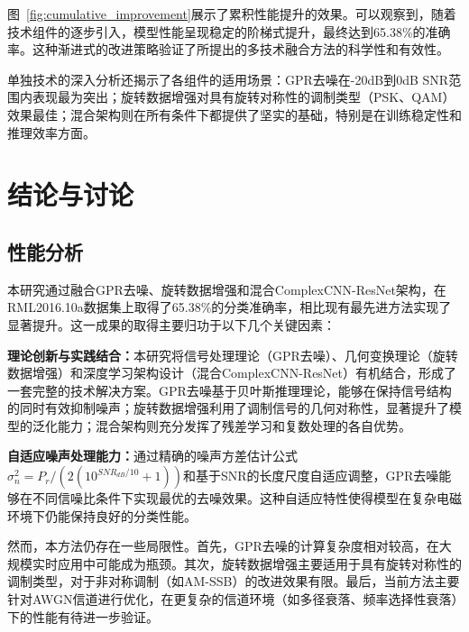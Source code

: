 \documentclass[conference]{IEEEtran}
\begin{document}
图~\ref{fig:cumulative_improvement}展示了累积性能提升的效果。可以观察到，随着技术组件的逐步引入，模型性能呈现稳定的阶梯式提升，最终达到65.38\%的准确率。这种渐进式的改进策略验证了所提出的多技术融合方法的科学性和有效性。

单独技术的深入分析还揭示了各组件的适用场景：GPR去噪在-20dB到0dB SNR范围内表现最为突出；旋转数据增强对具有旋转对称性的调制类型（PSK、QAM）效果最佳；混合架构则在所有条件下都提供了坚实的基础，特别是在训练稳定性和推理效率方面。

\section{结论与讨论}

\subsection{性能分析}

本研究通过融合GPR去噪、旋转数据增强和混合ComplexCNN-ResNet架构，在RML2016.10a数据集上取得了65.38\%的分类准确率，相比现有最先进方法实现了显著提升。这一成果的取得主要归功于以下几个关键因素：

\textbf{理论创新与实践结合：}本研究将信号处理理论（GPR去噪）、几何变换理论（旋转数据增强）和深度学习架构设计（混合ComplexCNN-ResNet）有机结合，形成了一套完整的技术解决方案。GPR去噪基于贝叶斯推理理论，能够在保持信号结构的同时有效抑制噪声；旋转数据增强利用了调制信号的几何对称性，显著提升了模型的泛化能力；混合架构则充分发挥了残差学习和复数处理的各自优势。


\textbf{自适应噪声处理能力：}通过精确的噪声方差估计公式$\sigma_n^2 = P_r/(2(10^{SNR_{dB}/10} + 1))$和基于SNR的长度尺度自适应调整，GPR去噪能够在不同信噪比条件下实现最优的去噪效果。这种自适应特性使得模型在复杂电磁环境下仍能保持良好的分类性能。

然而，本方法仍存在一些局限性。首先，GPR去噪的计算复杂度相对较高，在大规模实时应用中可能成为瓶颈。其次，旋转数据增强主要适用于具有旋转对称性的调制类型，对于非对称调制（如AM-SSB）的改进效果有限。最后，当前方法主要针对AWGN信道进行优化，在更复杂的信道环境（如多径衰落、频率选择性衰落）下的性能有待进一步验证。
\end{document}
